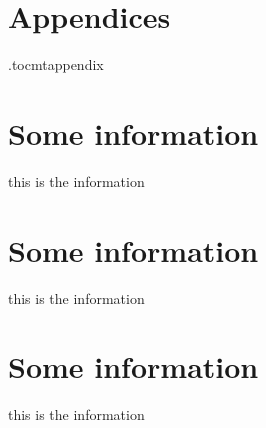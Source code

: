 \newpage
\section{Appendices}
\appendix
\newpage
\etocdepthtag.toc{mtappendix}
\tableofcontents
\newpage




\section{Some information}
this is the information


\section{Some information}
this is the information


\section{Some information}
this is the information


